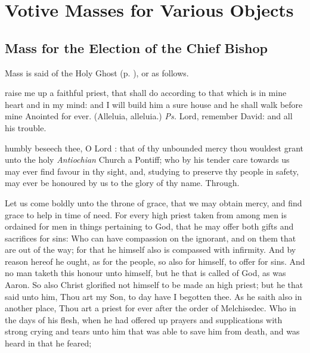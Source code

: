 \section{Votive Masses for Various Objects}

\subsection{Mass for the Election of the Chief Bishop}

\begin{rubric}
	Mass is said of the Holy Ghost (p. \pageref{VotiveHolyGhost}), or as follows.
\end{rubric}

\introit
{} raise me up a faithful priest, that shall do according to that which is in mine heart and in my mind: and I will build him a sure house and he shall walk before mine Anointed for ever. (Alleluia, alleluia.) \textit{Ps.} Lord, remember David: and all his trouble.

\collect
{} humbly beseech thee, O Lord : that of thy unbounded mercy thou wouldest grant unto the holy \textit{Antiochian} Church a Pontiff; who by his tender care towards us may ever find favour in thy sight, and, studying to preserve thy people in safety, may ever be honoured by us to the glory of thy name. Through.

 Let us come boldly unto the throne of grace, that we may obtain mercy, and find grace to help in time of need. For every high priest taken from among men is ordained for men in things pertaining to God, that he may offer both gifts and sacrifices for sins: Who can have compassion on the ignorant, and on them that are out of the way; for that he himself also is compassed with infirmity. And by reason hereof he ought, as for the people, so also for himself, to offer for sins. And no man taketh this honour unto himself, but he that is called of God, as was Aaron. So also Christ glorified not himself to be made an high priest; but he that said unto him, Thou art my Son, to day have I begotten thee. As he saith also in another place, Thou art a priest for ever after the order of Melchisedec. Who in the days of his flesh, when he had offered up prayers and supplications with strong crying and tears unto him that was able to save him from death, and was heard in that he feared;


